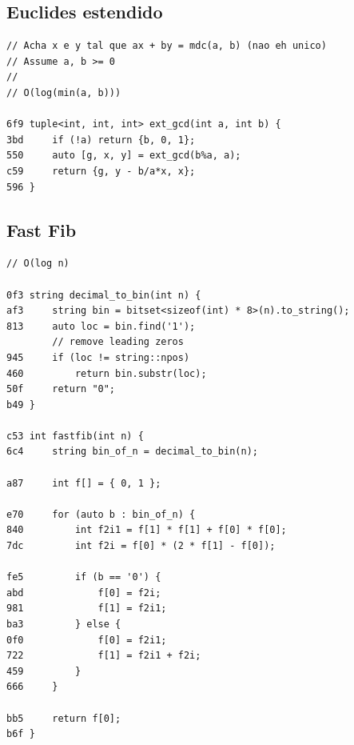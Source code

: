 \documentclass[11pt, a4paper, twoside]{article}
\begin{document}
\subsection{Euclides estendido}
\begin{lstlisting}
// Acha x e y tal que ax + by = mdc(a, b) (nao eh unico)
// Assume a, b >= 0
//
// O(log(min(a, b)))

6f9 tuple<int, int, int> ext_gcd(int a, int b) {
3bd     if (!a) return {b, 0, 1};
550     auto [g, x, y] = ext_gcd(b%a, a);
c59     return {g, y - b/a*x, x};
596 }
\end{lstlisting}

\subsection{Fast Fib}
\begin{lstlisting}
// O(log n)

0f3 string decimal_to_bin(int n) {
af3 	string bin = bitset<sizeof(int) * 8>(n).to_string();
813 	auto loc = bin.find('1');
    	// remove leading zeros
945 	if (loc != string::npos)
460 		return bin.substr(loc);
50f 	return "0";
b49 }

c53 int fastfib(int n) {
6c4 	string bin_of_n = decimal_to_bin(n);
    
a87 	int f[] = { 0, 1 };
    
e70 	for (auto b : bin_of_n) {
840 		int f2i1 = f[1] * f[1] + f[0] * f[0];
7dc 		int f2i = f[0] * (2 * f[1] - f[0]);
    
fe5 		if (b == '0') {
abd 			f[0] = f2i;
981 			f[1] = f2i1;
ba3 		} else {
0f0 			f[0] = f2i1;
722 			f[1] = f2i1 + f2i;
459 		}
666 	}
    
bb5 	return f[0];
b6f }
\end{lstlisting}
\end{document}
